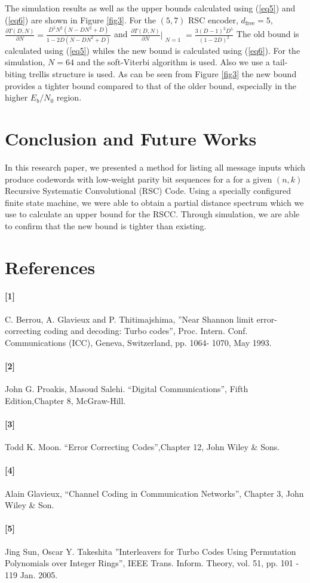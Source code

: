 \documentclass[twocolumn]{article}
\begin{document}
		The simulation results as well as the upper bounds calculated using (\ref{eq5}) and (\ref{eq6}) are shown in Figure \ref{fig3}. 
		For the $(5,7)$ RSC encoder, $d_{\text{free}}=5$, $\frac{\partial T(D,N)}{\partial N} =\frac{D^5N^2(N-DN^2+D)}{1-2D(N-DN^2+D)}$ and $\frac{\partial T(D,N)}{\partial N}\Bigr|_{\substack{N=1}} = \frac{3(D-1)^2D^5}{(1-2D)^2}$
		The old bound is calculated using  (\ref{eq5}) whiles the new bound is calculated using  (\ref{eq6}). For the simulation, $N=64$ and the soft-Viterbi algorithm is used. Also we use a tail-biting trellis structure is used. As can be seen from Figure \ref{fig3} the new bound provides a tighter bound compared to that of the older bound, especially in the higher $E_b/N_0$ region.
\section{Conclusion and Future Works}
\label{sec6}
In this research paper, we presented a method for listing all message inputs which produce codewords with low-weight parity bit sequences for a for a given $(n,k)$ Recursive Systematic Convolutional (RSC) Code. Using a specially configured finite state machine, we were able to obtain a partial distance spectrum which we use to calculate an upper bound for the RSCC. Through simulation, we are able to confirm that the new bound is tighter than existing. 
\section{References}
\label{7}
\paragraph{[1]}  C. Berrou, A. Glavieux and P. Thitimajshima, 
''Near Shannon limit error-correcting coding and
decoding: Turbo codes'', Proc. Intern. Conf. Communications (ICC), Geneva, 
Switzerland, pp. 1064-
1070, May 1993.
\paragraph{[2]}   John G. Proakis, Masoud Salehi. ``Digital Communications'', 
Fifth Edition,Chapter 8, McGraw-Hill.
\paragraph{[3]}   Todd K. Moon. ``Error Correcting Codes'',Chapter 12, John Wiley \& Sons.
\paragraph{[4]}  Alain Glavieux, ``Channel Coding in Communication Networks'', Chapter 3, John Wiley \& Son. 
 
\paragraph{[5]}  Jing Sun, Oscar Y. Takeshita ''Interleavers for Turbo Codes Using 
Permutation Polynomials over Integer Rings'', IEEE Trans. Inform. Theory, vol. 51, 
pp. 101 - 119  Jan. 2005.
\end{document}
